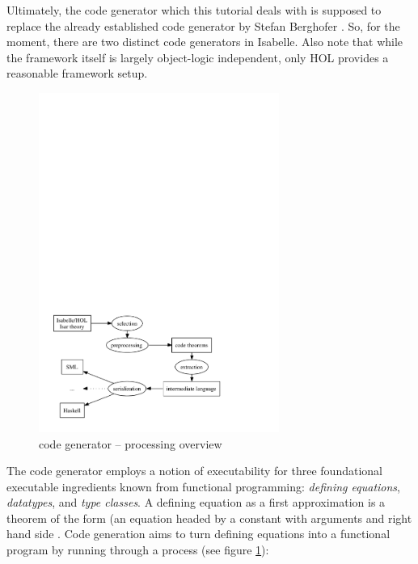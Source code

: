 \begin{isabellebody}
\begin{isamarkuptext}
  \begin{warn}
    Ultimately, the code generator which this tutorial deals with
    is supposed to replace the already established code generator
    by Stefan Berghofer \cite{Berghofer-Nipkow:2002}.
    So, for the moment, there are two distinct code generators
    in Isabelle.
    Also note that while the framework itself is largely
    object-logic independent, only HOL provides a reasonable
    framework setup.    
  \end{warn}%
\end{isamarkuptext}%
\isamarkuptrue%
%
\isamarkuptrue%
%
\begin{isamarkuptext}%
\begin{figure}[h]
  \centering
  \includegraphics[width=0.7\textwidth]{codegen_process}
  \caption{code generator -- processing overview}
  \label{fig:process}
  \end{figure}

  The code generator employs a notion of executability
  for three foundational executable ingredients known
  from functional programming:
  \emph{defining equations}, \emph{datatypes}, and
  \emph{type classes}. A defining equation as a first approximation
  is a theorem of the form 
  (an equation headed by a constant  with arguments
   and right hand side .
  Code generation aims to turn defining equations
  into a functional program by running through
  a process (see figure \ref{fig:process}):


\end{isamarkuptext}
\end{isabellebody}

